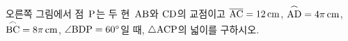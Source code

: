 \noindent\begin{minipage}[t]{0.58\linewidth}\vspace{0pt}\raggedright 오른쪽 그림에서 점~$\mathrm{P}$는 두 현~$\mathrm{AB}$와 $\mathrm{CD}$의 교점이고 $\overline{\mathrm{AC}}=12\,\mathrm{cm}$, $\overset{\frown}{\mathrm{AD}}=4\pi\,\mathrm{cm}$, $\overset{\frown}{\mathrm{BC}}=8\pi\,\mathrm{cm}$, $\angle\mathrm{BDP}=60^\circ$일 때, $\triangle\mathrm{ACP}$의 넓이를 구하시오.\end{minipage}\hfill\begin{minipage}[t]{0.4\linewidth}\vspace{0pt}\centering \resizebox{\ifdim\width>\linewidth\linewidth\else\width\fi}{!}{}\end{minipage}\par
